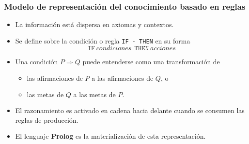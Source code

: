 \documentclass[
10pt, %
aspectratio=169, %
]{beamer}
\begin{document}
	\begin{frame}
		
		\frametitle{Modelo de representación del conocimiento basado en reglas}
		
		\begin{itemize}
			
			\item La información está dispersa en axiomas y contextos.

			\vspace{1\baselineskip}
			\item Se define sobre la condición o regla \texttt{IF - THEN} en su forma
			$$\texttt{IF}\ condiciones\ \ \texttt{THEN}\ acciones$$
			
			\vspace{1\baselineskip}			
			\item Una condición $P \Rightarrow Q$ puede entenderse como una transformación de 
			\begin{itemize}
				\item las afirmaciones de $P$ a las afirmaciones de $Q$, o
				\item las metas de $Q$ a las metas de $P$.
			\end{itemize}
			
			\vspace{1\baselineskip}
			\item El razonamiento es activado en cadena hacia delante cuando se consumen las reglas de producción.
			
			\vspace{1\baselineskip}
			\item El lenguaje \textbf{Prolog} es la materialización de esta representación.
					
		\end{itemize}
		
	\end{frame}
	
\end{document}
